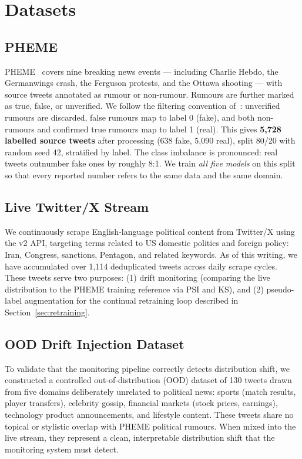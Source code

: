 \documentclass[sigconf]{acmart}
\begin{document}
\section{Datasets}

\subsection{PHEME}

PHEME~\cite{zubiaga2016analysing} covers nine breaking news events — including Charlie Hebdo,
the Germanwings crash, the Ferguson protests, and the Ottawa shooting — with source tweets
annotated as rumour or non-rumour. Rumours are further marked as true, false, or unverified.
We follow the filtering convention of~\citet{kochkina2018all}: unverified rumours are
discarded, false rumours map to label 0 (fake), and both non-rumours and confirmed true
rumours map to label 1 (real). This gives \textbf{5,728 labelled source tweets} after
processing (638 fake, 5,090 real), split 80/20 with random seed 42, stratified by label.
The class imbalance is pronounced: real tweets outnumber fake ones by roughly 8:1. We train
\textit{all five models} on this split so that every reported number refers to the same data
and the same domain.

\subsection{Live Twitter/X Stream}

We continuously scrape English-language political content from Twitter/X using the v2 API,
targeting terms related to US domestic politics and foreign policy: Iran, Congress, sanctions,
Pentagon, and related keywords. As of this writing, we have accumulated over 1,114 deduplicated
tweets across daily scrape cycles. These tweets serve two purposes: (1) drift monitoring
(comparing the live distribution to the PHEME training reference via PSI and KS), and (2)
pseudo-label augmentation for the continual retraining loop described in Section~\ref{sec:retraining}.

\subsection{OOD Drift Injection Dataset}

To validate that the monitoring pipeline correctly detects distribution shift, we constructed
a controlled out-of-distribution (OOD) dataset of 130 tweets drawn from five domains
deliberately unrelated to political news: sports (match results, player transfers), celebrity
gossip, financial markets (stock prices, earnings), technology product announcements, and
lifestyle content. These tweets share no topical or stylistic overlap with PHEME political
rumours. When mixed into the live stream, they represent a clean, interpretable distribution
shift that the monitoring system must detect.
\end{document}
